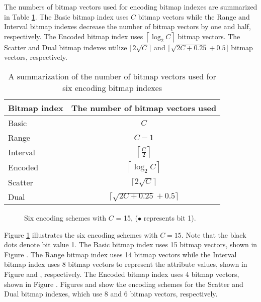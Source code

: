 \documentclass[../main/thesis.tex]{subfiles}
\begin{document}
The numbers of bitmap vectors used for encoding bitmap indexes are summarized in Table \ref{tab:sumarize_bitmapvector}. The Basic bitmap index uses $C$ bitmap vectors while the Range and Interval bitmap indexes decrease the number of bitmap vectors by one and half, respectively. The Encoded bitmap index uses $\left\lceil \log_2 C \right\rceil$ bitmap vectors. The Scatter and Dual bitmap indexes utilize $\lceil 2\sqrt{C}\rceil$ and $\lceil\sqrt{2C+0.25}+0.5 \rceil$ bitmap vectors, respectively.

\begin{table}[h]
	\setlength{\tabcolsep}{15pt}
	\centering
	\caption{A summarization of the number of bitmap vectors used for six encoding bitmap indexes}
	\label{tab:sumarize_bitmapvector}
	\begin{tabular}{l c}
		\toprule
		Bitmap index & The number of bitmap vectors used \\
		\midrule
		Basic & $C$ \\
		Range & $C-1$ \\
		Interval & $\left\lceil \frac{C}{2} \right\rceil$ \\
		Encoded & $\left\lceil \log_2 C \right\rceil$ \\
		Scatter & $\lceil 2\sqrt{C}\rceil$ \\
		Dual & $\lceil\sqrt{2C+0.25}+0.5 \rceil$ \\
		\bottomrule
	\end{tabular}
\end{table}

\begin{figure}[!b]
	\centering
	{}
	\hfil
	{}
	\hfil
	{}
	\hfil
	{}
	\hfil
	{}
	\hfil
	{}
	\hfil
	\caption{Six encoding schemes with $C$ = 15, ($\bullet$ represents bit 1).}
	\label{fig:encoding_schemes}
\end{figure}

Figure \ref{fig:encoding_schemes} illustrates the six encoding schemes with $C= 15$. Note that the black dots denote bit value 1. The Basic bitmap index uses 15 bitmap vectors, shown in Figure . The Range bitmap index uses 14 bitmap vectors while the Interval bitmap index uses 8 bitmap vectors to represent the attribute values, shown in Figure  and , respectively. The Encoded bitmap index uses 4 bitmap vectors, shown in Figure . Figures  and  show the encoding schemes for the Scatter and Dual bitmap indexes, which use 8 and 6 bitmap vectors, respectively.
\end{document}
